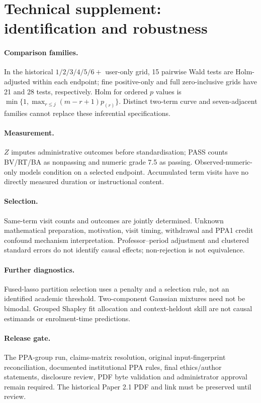 \section*{Technical supplement: identification and robustness}
\paragraph{Comparison families.} In the historical $1/2/3/4/5/6+$ user-only grid, 15 pairwise Wald tests are Holm-adjusted within each endpoint; fine positive-only and full zero-inclusive grids have 21 and 28 tests, respectively. Holm for ordered $p$ values is $\min\{1,\max_{r\le j}(m-r+1)p_{(r)}\}$. Distinct two-term curve and seven-adjacent families cannot replace these inferential specifications.
\paragraph{Measurement.} $Z$ imputes administrative outcomes before standardisation; PASS counts BV/RT/BA as nonpassing and numeric grade 7.5 as passing. Observed-numeric-only models condition on a selected endpoint. Accumulated term visits have no directly measured duration or instructional content.
\paragraph{Selection.} Same-term visit counts and outcomes are jointly determined. Unknown mathematical preparation, motivation, visit timing, withdrawal and PPA1 credit confound mechanism interpretation. Professor--period adjustment and clustered standard errors do not identify causal effects; non-rejection is not equivalence.
\paragraph{Further diagnostics.} Fused-lasso partition selection uses a penalty and a selection rule, not an identified academic threshold. Two-component Gaussian mixtures need not be bimodal. Grouped Shapley fit allocation and context-heldout skill are not causal estimands or enrolment-time predictions.
\paragraph{Release gate.} The PPA-group run, claims-matrix resolution, original input-fingerprint reconciliation, documented institutional PPA rules, final ethics/author statements, disclosure review, PDF byte validation and administrator approval remain required. The historical Paper 2.1 PDF and link must be preserved until review.
